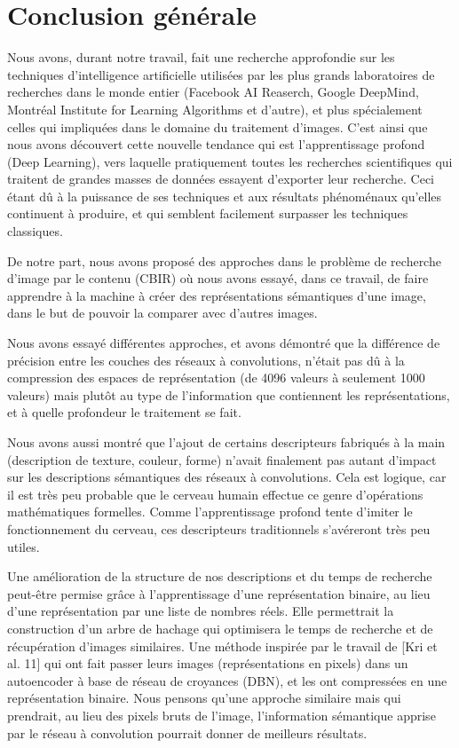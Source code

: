 
\chapter*{Conclusion générale} %

Nous avons, durant notre travail, fait une recherche approfondie sur les techniques d'intelligence artificielle utilisées par les plus grands laboratoires de recherches dans le monde entier (Facebook AI Reaserch, Google DeepMind, Montréal Institute for Learning Algorithms et d'autre), et plus spécialement celles qui impliquées dans le domaine du traitement d'images. C'est ainsi que nous avons découvert cette nouvelle tendance qui est l'apprentissage profond (Deep Learning), vers laquelle pratiquement toutes les recherches scientifiques qui traitent de grandes masses de données essayent d'exporter leur recherche. Ceci étant dû à la puissance de ses techniques et aux résultats phénoménaux qu'elles continuent à produire, et qui semblent facilement surpasser les techniques classiques.

	De notre part, nous avons proposé des approches dans le problème de recherche d'image par le contenu (CBIR) où nous avons essayé, dans ce travail, de faire apprendre à la machine à créer des représentations sémantiques d'une image, dans le but de pouvoir la comparer avec d'autres images.

	Nous avons essayé différentes approches, et avons démontré que la différence de précision entre les couches des réseaux à convolutions, n’était pas dû à la compression des espaces de représentation (de 4096 valeurs à seulement 1000 valeurs) mais plutôt au type de l'information que contiennent les représentations, et à quelle profondeur le traitement se fait. 

Nous avons aussi montré que l'ajout de certains descripteurs fabriqués à la main (description de texture, couleur, forme) n'avait finalement pas autant d'impact sur les descriptions sémantiques des réseaux à convolutions. Cela est logique, car il est très peu probable que le cerveau humain effectue ce genre d’opérations mathématiques formelles. Comme l'apprentissage profond tente d'imiter le fonctionnement du cerveau, ces descripteurs traditionnels s’avéreront très peu utiles.

Une amélioration de la structure de nos descriptions et du temps de recherche peut-être permise grâce à l'apprentissage d'une représentation binaire, au lieu d'une représentation par une liste de nombres réels. Elle permettrait la construction d'un arbre de hachage qui optimisera le temps de recherche et de récupération d'images similaires. Une méthode inspirée par le travail de [Kri et al. 11] qui ont fait passer leurs images (représentations en pixels) dans un autoencoder à base de réseau de croyances (DBN), et les ont compressées en une représentation binaire. Nous pensons qu'une approche similaire mais qui prendrait, au lieu des pixels bruts de l'image, l'information sémantique apprise par le réseau à convolution pourrait donner de meilleurs résultats.

	

